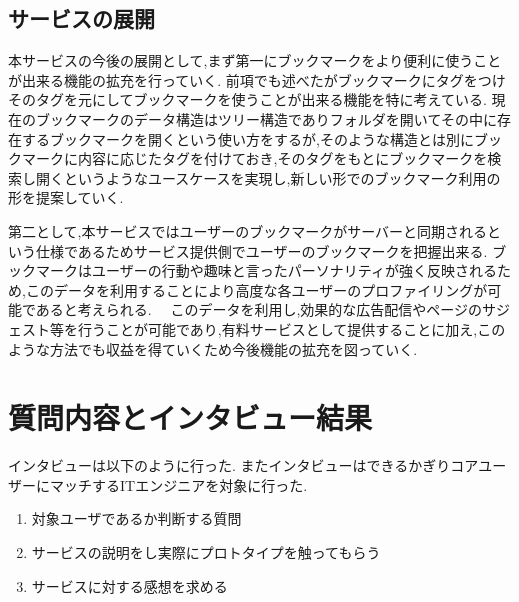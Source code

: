 \documentclass[a4paper,10pt,fleqn]{jsarticle}
\begin{document}
\subsection{サービスの展開}
本サービスの今後の展開として,まず第一にブックマークをより便利に使うことが出来る機能の拡充を行っていく.
前項でも述べたがブックマークにタグをつけそのタグを元にしてブックマークを使うことが出来る機能を特に考えている.
現在のブックマークのデータ構造はツリー構造でありフォルダを開いてその中に存在するブックマークを開くという使い方をするが,そのような構造とは別にブックマークに内容に応じたタグを付けておき,そのタグをもとにブックマークを検索し開くというようなユースケースを実現し,新しい形でのブックマーク利用の形を提案していく.
\par
第二として,本サービスではユーザーのブックマークがサーバーと同期されるという仕様であるためサービス提供側でユーザーのブックマークを把握出来る. ブックマークはユーザーの行動や趣味と言ったパーソナリティが強く反映されるため,このデータを利用することにより高度な各ユーザーのプロファイリングが可能であると考えられる. 　このデータを利用し,効果的な広告配信やページのサジェスト等を行うことが可能であり,有料サービスとして提供することに加え,このような方法でも収益を得ていくため今後機能の拡充を図っていく.

\section{質問内容とインタビュー結果}
インタビューは以下のように行った. またインタビューはできるかぎりコアユーザーにマッチするITエンジニアを対象に行った.
\begin{enumerate}
  \item 対象ユーザであるか判断する質問
  \item サービスの説明をし実際にプロトタイプを触ってもらう
  \item サービスに対する感想を求める
\end{enumerate}
\end{document}
